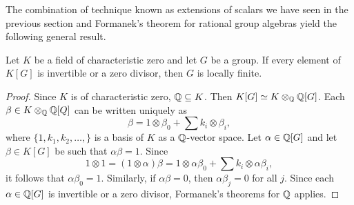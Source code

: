 The combination of technique known as extensions of scalars we have seen in the previous section
and Formanek's theorem for rational group algebras 
yield the following general result. 

\begin{theorem}[Formanek]
	Let $K$ be a field of characteristic zero and let $G$ be a group. 
	If every element of $K[G]$ is invertible or a zero divisor, 
	then $G$ is locally finite. 
\end{theorem}

\begin{proof}
	Since $K$ is of characteristic zero, $\mathbb{Q}\subseteq K$. Then $K[G]\simeq
	K\otimes_{\mathbb{Q}}\mathbb{Q}[G]$. Each $\beta\in K\otimes_{\mathbb{Q}}\mathbb{Q}[Q]$ can be written
	uniquely as 
	\[
		\beta=1\otimes\beta_0+\sum k_i\otimes\beta_i,
	\]
	where $\{1,k_1,k_2,\dots,\}$ is a basis of $K$ as a $\mathbb{Q}$-vector space. 
	Let $\alpha\in\mathbb{Q}[G]$ and let $\beta\in K[G]$ be such that $\alpha\beta=1$. Since
	\[
	1\otimes 1=(1\otimes\alpha)\beta=1\otimes \alpha\beta_0+\sum k_i\otimes \alpha\beta_i,
	\]
	it follows that $\alpha\beta_0=1$. Similarly, if
	$\alpha\beta=0$, then $\alpha\beta_j=0$ for all $j$. Since 
	each $\alpha\in\mathbb{Q}[G]$ is invertible or a zero divisor, Formanek's theorems 
	for $\mathbb{Q}$ applies. 
\end{proof}






